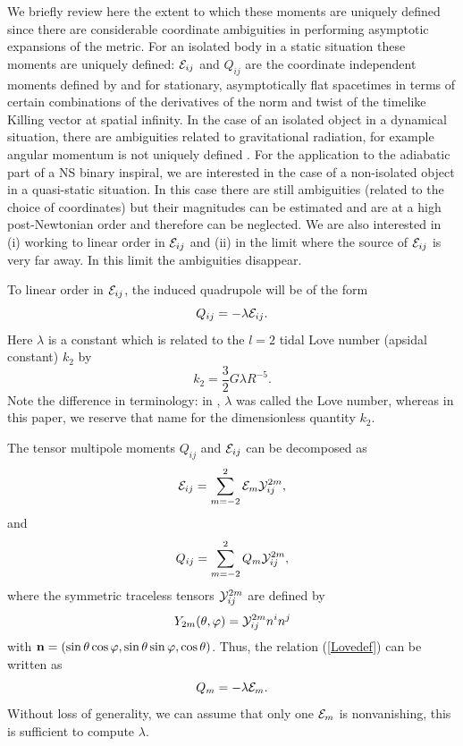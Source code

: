 \documentclass[12pt,preprint]{aastex}
\begin{document}
{We briefly review here the extent to which these moments are
uniquely defined since there are considerable coordinate ambiguities
in performing asymptotic expansions of the metric. For an isolated
body in a static situation these moments are uniquely defined:
${\cal E}_{ij}$ and $Q_{ij}$ are the coordinate independent moments
 defined by \citet{geroch} and \citet{hansen} for stationary, asymptotically flat
spacetimes in terms of certain combinations of the derivatives of
the norm and twist of the timelike Killing vector at spatial
infinity. In the case of an isolated object in a dynamical
situation, there are ambiguities related to gravitational radiation,
for example angular momentum is not uniquely defined \citep{wald}.
For the application to the adiabatic part of a NS binary inspiral,
we are interested in the case of a non-isolated object in a
quasi-static situation. In this case there are still ambiguities
(related to the choice of coordinates) but their magnitudes can be
estimated \citep{thornehartle} and are at a high post-Newtonian
order and therefore can be neglected. We are also interested in (i)
working to linear order in ${\cal E}_{ij}$ and (ii) in the limit
where the source of ${\cal E}_{ij}$ is very far away. In this limit
the ambiguities disappear.

To linear order in ${\cal E}_{ij}$, the induced quadrupole will be
of the form \begin{equation} Q_{ij} =- \lambda {\cal E}_{ij}.
\label{Lovedef} \end{equation} Here $\lambda$ is a constant which is
related to the $l=2$ tidal Love number (apsidal constant) $k_2$  by
\citep{tidal} \begin{equation} k_2 = \frac{3}{2}G \lambda
R^{-5}.\label{k2def}\end{equation} Note the difference in
terminology: in \citet{tidal}, $\lambda$ was called the Love number,
whereas in this paper, we reserve that name for the dimensionless
quantity $k_2$.


The tensor multipole moments $Q_{ij}$ and ${\cal E}_{ij}$ can be
decomposed as \begin{equation} {\cal E}_{ij}=\sum^2_{m=-2}{\cal E}_m
{\cal Y}^{2m}_{ij},\label{emdef}\end{equation} and \begin{equation}
{Q}_{ij}=\sum^2_{m=-2}{Q}_m {\cal
Y}^{2m}_{ij},\label{qmdef}\end{equation} where the symmetric
traceless tensors ${\cal Y}^{2m}_{ij}$ are defined by
\citep{Thorne1980} \begin{equation} Y_{2m}(\theta, \varphi)={\cal
Y}^{2m}_{ij}n^i n^j\end{equation} with ${\bf
n}=(\sin\theta\cos\varphi,\sin\theta\sin\varphi,\cos \theta)$. Thus,
the relation (\ref{Lovedef}) can be written as \begin{equation}
Q_{m} =- \lambda {\cal E}_{m}. \label{Lovedef1} \end{equation}
Without loss of generality, we can assume that only one ${\cal E}_m$
is nonvanishing, this is sufficient to compute $\lambda$.



}
\end{document}
